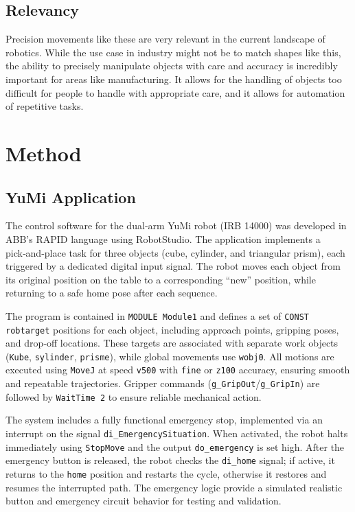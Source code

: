 \documentclass[a4paper,12pt]{article}
\begin{document}
\subsection{Relevancy}
Precision movements like these are very relevant in the current landscape of robotics. While the use case in industry
might not be to match shapes like this, the ability to precisely manipulate objects with care and accuracy
is incredibly important for areas like manufacturing. It allows for the handling of objects too
difficult for people to handle with appropriate care, and it allows for automation of
repetitive tasks.

\section{Method}

\subsection{YuMi Application}
The control software for the dual‑arm YuMi robot (IRB 14000) was developed in ABB’s RAPID language using RobotStudio. The application implements a pick‑and‑place task for three objects (cube, cylinder, and triangular prism), each triggered by a dedicated digital input signal. The robot moves each object from its original position on the table to a corresponding “new” position, while returning to a safe home pose after each sequence.

The program is contained in \texttt{MODULE Module1} and defines a set of \texttt{CONST robtarget} positions for each object, including approach points, gripping poses, and drop‑off locations. These targets are associated with separate work objects (\texttt{Kube}, \texttt{sylinder}, \texttt{prisme}), while global movements use \texttt{wobj0}. All motions are executed using \texttt{MoveJ} at speed \texttt{v500} with \texttt{fine} or \texttt{z100} accuracy, ensuring smooth and repeatable trajectories. Gripper commands (\texttt{g\_GripOut}/\texttt{g\_GripIn}) are followed by \texttt{WaitTime 2} to ensure reliable mechanical action.

The system includes a fully functional emergency stop, implemented via an interrupt on the signal \texttt{di\_EmergencySituation}. When activated, the robot halts immediately using \texttt{StopMove} and the output \texttt{do\_emergency} is set high. After the emergency button is released, the robot checks the \texttt{di\_home} signal; if active, it returns to the \texttt{home} position and restarts the cycle, otherwise it restores and resumes the interrupted path. The emergency logic provide a simulated realistic button and emergency circuit behavior for testing and validation.
\end{document}
